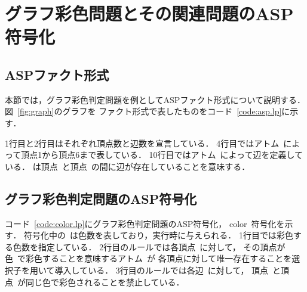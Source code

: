 \chapter{グラフ彩色問題とその関連問題のASP符号化}

\section{ASPファクト形式}



本節では，グラフ彩色判定問題を例としてASPファクト形式について説明する．
図~\ref{fig:graph}のグラフを
ファクト形式で表したものをコード~\ref{code:asp.lp}に示す．

1行目と2行目はそれぞれ頂点数と辺数を宣言している．
4行目ではアトム~によって頂点1から頂点6まで表している．
10行目ではアトム~によって辺を定義している．
は頂点~と頂点~の間に辺が存在していることを意味する．

\section{グラフ彩色判定問題のASP符号化}



コード~\ref{code:color.lp}にグラフ彩色判定問題のASP符号化，
\textsf{color}~符号化を示す．
符号化中の~は色数を表しており，実行時に与えられる．
1行目では彩色する色数を指定している．
2行目のルールでは各頂点~に対して，
その頂点が色~で彩色することを意味するアトム~が
各頂点に対して唯一存在することを選択子を用いて導入している．
3行目のルールでは各辺~に対して，
頂点~と頂点~が同じ色で彩色されることを禁止している．

